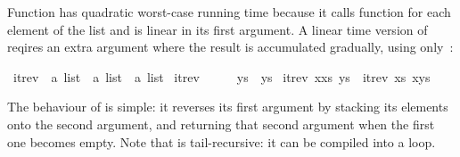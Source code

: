 \begin{isabellebody}
\begin{isamarkuptext}
Function  has quadratic worst-case running time
because it calls function \isa{{\isacharat}} for each element of the list and
\isa{{\isacharat}} is linear in its first argument.  A linear time version of
 reqires an extra argument where the result is accumulated
gradually, using only~\isa{{\isacharhash}}:%
\end{isamarkuptext}%
\isamarkuptrue%
\isamarkupfalse%
\ itrev\ {\isacharcolon}{\isacharcolon}\ {\isachardoublequoteopen}{\isacharprime}a\ list\ {\isasymRightarrow}\ {\isacharprime}a\ list\ {\isasymRightarrow}\ {\isacharprime}a\ list{\isachardoublequoteclose}\ \isanewline
{\isachardoublequoteopen}itrev\ {\isacharbrackleft}{\isacharbrackright}\ \ \ \ \ ys\ {\isacharequal}\ ys{\isachardoublequoteclose}\ {\isacharbar}\isanewline
{\isachardoublequoteopen}itrev\ {\isacharparenleft}x{\isacharhash}xs{\isacharparenright}\ ys\ {\isacharequal}\ itrev\ xs\ {\isacharparenleft}x{\isacharhash}ys{\isacharparenright}{\isachardoublequoteclose}%
\begin{isamarkuptext}%
\noindent
The behaviour of  is simple: it reverses
its first argument by stacking its elements onto the second argument,
and returning that second argument when the first one becomes
empty. Note that  is tail-recursive: it can be
compiled into a loop.


\end{isamarkuptext}
\end{isabellebody}
